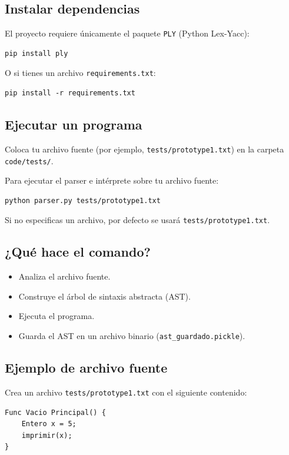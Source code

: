 \documentclass{article}
\begin{document}
\subsection{Instalar dependencias}
El proyecto requiere únicamente el paquete \texttt{PLY} (Python Lex-Yacc):

\begin{verbatim}
pip install ply
\end{verbatim}

O si tienes un archivo \texttt{requirements.txt}:
\begin{verbatim}
pip install -r requirements.txt
\end{verbatim}

\subsection{Ejecutar un programa}
Coloca tu archivo fuente (por ejemplo, \texttt{tests/prototype1.txt}) en la carpeta \texttt{code/tests/}.

Para ejecutar el parser e intérprete sobre tu archivo fuente:
\begin{verbatim}
python parser.py tests/prototype1.txt
\end{verbatim}

Si no especificas un archivo, por defecto se usará \texttt{tests/prototype1.txt}.

\subsection{¿Qué hace el comando?}
\begin{itemize}
    \item Analiza el archivo fuente.
    \item Construye el árbol de sintaxis abstracta (AST).
    \item Ejecuta el programa.
    \item Guarda el AST en un archivo binario (\texttt{ast\_guardado.pickle}).
\end{itemize}

\subsection{Ejemplo de archivo fuente}
Crea un archivo \texttt{tests/prototype1.txt} con el siguiente contenido:

\begin{verbatim}
Func Vacio Principal() {
    Entero x = 5;
    imprimir(x);
}
\end{verbatim}
\end{document}
